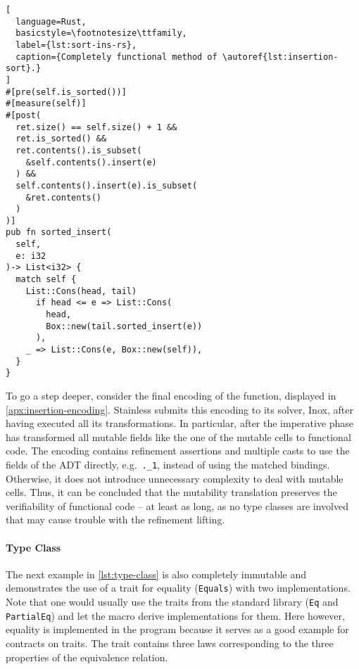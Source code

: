 \noindent\begin{minipage}[t]{.43\textwidth}
\begin{lstlisting}[
  language=Rust,
  basicstyle=\footnotesize\ttfamily,
  label={lst:sort-ins-rs},
  caption={Completely functional method of \autoref{lst:insertion-sort}.}
]
#[pre(self.is_sorted())]
#[measure(self)]
#[post(
  ret.size() == self.size() + 1 &&
  ret.is_sorted() &&
  ret.contents().is_subset(
    &self.contents().insert(e)
  ) &&
  self.contents().insert(e).is_subset(
    &ret.contents()
  )
)]
pub fn sorted_insert(
  self,
  e: i32
)-> List<i32> {
  match self {
    List::Cons(head, tail)
      if head <= e => List::Cons(
        head,
        Box::new(tail.sorted_insert(e))
      ),
    _ => List::Cons(e, Box::new(self)),
  }
}
\end{lstlisting}
\end{minipage}\hfill
\begin{minipage}[t]{.55\textwidth}

\end{minipage}

To go a step deeper, consider the final encoding of the function, displayed in
\autoref{apx:insertion-encoding}. Stainless submits this encoding to its solver,
Inox, after having executed all its transformations. In particular, after the
imperative phase has transformed all mutable fields like the one of the mutable
cells to functional code. The encoding contains refinement assertions and
multiple casts to use the fields of the ADT directly, e.g.~\lstinline!._1!,
instead of using the matched bindings. Otherwise, it does not introduce
unnecessary complexity to deal with mutable cells. Thus, it can be concluded
that the mutability translation preserves the verifiability of functional code
-- at least as long, as no type classes are involved that may cause trouble with
the refinement lifting.

\paragraph{Type Class}

The next example in \autoref{lst:type-class} is also completely immutable and
demonstrates the use of a trait for equality (\lstinline!Equals!) with two
implementations. Note that one would usually use the traits from the standard
library (\lstinline!Eq! and \lstinline!PartialEq!) and let the macro derive
implementations for them. Here however, equality is implemented in the program
because it serves as a good example for contracts on traits. The trait contains
three laws corresponding to the three properties of the equivalence relation.

